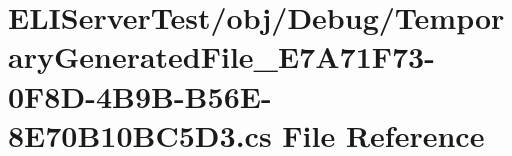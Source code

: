 \hypertarget{_e_l_i_server_2_e_l_i_server_test_2obj_2_debug_2_temporary_generated_file___e7_a71_f73-0_f8_d-4_531c3281be42f200254a5c3658e72e00}{}\section{E\+L\+I\+Server\+Test/obj/\+Debug/\+Temporary\+Generated\+File\+\_\+\+E7\+A71\+F73-\/0\+F8\+D-\/4\+B9\+B-\/\+B56\+E-\/8\+E70\+B10\+B\+C5\+D3.cs File Reference}
\label{_e_l_i_server_2_e_l_i_server_test_2obj_2_debug_2_temporary_generated_file___e7_a71_f73-0_f8_d-4_531c3281be42f200254a5c3658e72e00}
